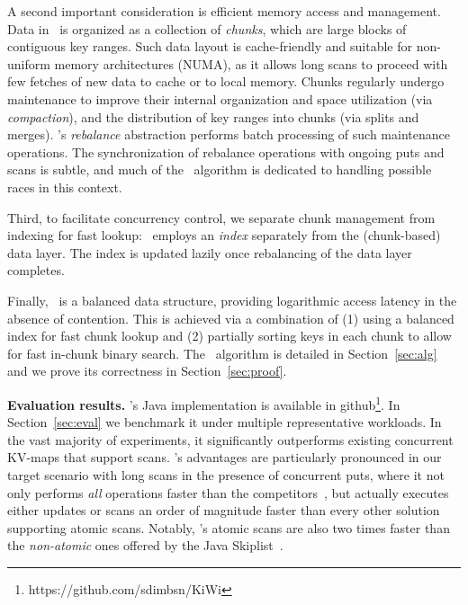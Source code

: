 A second important consideration is efficient memory access and management. Data in \kiwi\ is organized
as a collection of {\em chunks}, which are large blocks of contiguous key ranges.
Such data layout is cache-friendly and suitable for non-uniform memory architectures (NUMA), as it
allows long scans to proceed with few fetches of new data to cache or to local memory.
Chunks regularly undergo maintenance to improve their internal organization and space utilization (via \emph{compaction}), and the distribution of key ranges into chunks (via splits and merges).
\kiwi's {\em rebalance\/} abstraction performs batch processing
of such maintenance operations. The synchronization of
rebalance operations with ongoing puts and scans is subtle, and much of the \kiwi\ algorithm is dedicated to handling
possible races in this context.

Third, to facilitate concurrency control, we separate chunk management from indexing for fast lookup:
\kiwi\ employs an \emph{index} separately from the (chunk-based) data layer.
The index is updated lazily once rebalancing of the data layer completes.

Finally, \kiwi\ is a balanced data structure, providing logarithmic access latency in the absence of contention.
This is achieved via a combination of (1) using a balanced index for fast chunk lookup and (2) partially sorting keys in each
chunk to allow for fast in-chunk binary search. The \kiwi\ algorithm is detailed in Section~\ref{sec:alg}
and we prove its correctness in Section~\ref{sec:proof}.


{\bf{Evaluation results.}}
\kiwi's Java implementation is available in github\footnote{https://github.com/sdimbsn/KiWi}. In Section~\ref{sec:eval} we benchmark it under multiple representative workloads.
In the vast majority of  experiments, it significantly outperforms existing concurrent KV-maps that support scans.
\kiwi's advantages are particularly pronounced in our target scenario with long scans in the presence of concurrent puts, where
it not only performs \emph{all} operations faster than the competitors~\cite{BrownA12,BronsonCCO2010},
but actually executes either updates or scans an order of magnitude faster than every other solution supporting atomic scans.
Notably, \kiwi's atomic scans are also two times faster than the \emph{non-atomic}
ones offered by the Java Skiplist~\cite{JavaConcurrentSkipList}. 


